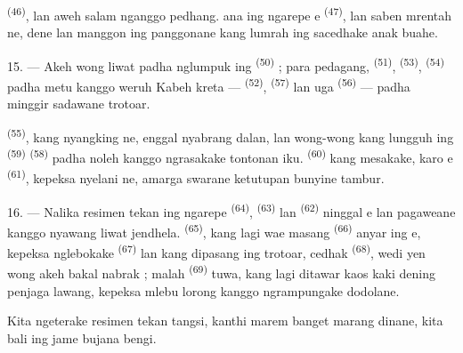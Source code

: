  \textsuperscript{(46)},  lan
 aweh salam nganggo pedhang.  ana ing ngarepe e \textsuperscript{(47)}, lan
saben  mrentah ne, dene  lan  manggon ing panggonane kang
lumrah ing sacedhake anak buahe.

15. --- Akeh wong liwat padha nglumpuk ing 
\textsuperscript{(50)} ; para pedagang, 
\textsuperscript{(51)}, 
\textsuperscript{(53)},  \textsuperscript{(54)}
padha metu kanggo weruh  Kabeh kreta —
 \textsuperscript{(52)}, 
\textsuperscript{(57)} lan uga 
\textsuperscript{(56)} — padha minggir sadawane trotoar.

\VUsaut{3.0mm}

 \textsuperscript{(55)}, kang nyangking
ne, enggal nyabrang dalan, lan wong-wong kang
lungguh ing  \textsuperscript{(59)} 
\textsuperscript{(58)} padha noleh kanggo ngrasakake tontonan iku.
 \textsuperscript{(60)} kang mesakake, karo
e \textsuperscript{(61)}, kepeksa nyelani
ne, amarga swarane ketutupan bunyine tambur.

16. --- Nalika resimen tekan ing ngarepe 
\textsuperscript{(64)}, 
\textsuperscript{(63)} lan  \textsuperscript{(62)}
ninggal e lan pagaweane kanggo nyawang liwat
jendhela.  \textsuperscript{(65)}, kang lagi wae
masang  \textsuperscript{(66)} anyar ing
e, kepeksa nglebokake 
\textsuperscript{(67)} lan  kang dipasang ing trotoar,
cedhak  \textsuperscript{(68)}, wedi yen wong akeh
bakal nabrak ; malah  \textsuperscript{(69)} tuwa,
kang lagi ditawar kaos kaki dening penjaga lawang, kepeksa mlebu
lorong kanggo ngrampungake dodolane.

Kita ngeterake resimen tekan tangsi,  kanthi marem banget
marang dinane, kita bali ing jame bujana bengi.

\VUsaut{3.0mm}

